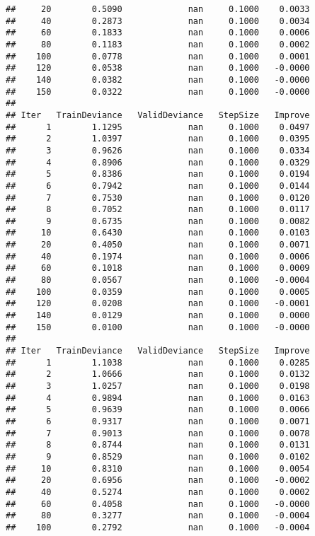 \documentclass[]{article}
\begin{document}
\begin{verbatim}
##     20        0.5090             nan     0.1000    0.0033
##     40        0.2873             nan     0.1000    0.0034
##     60        0.1833             nan     0.1000    0.0006
##     80        0.1183             nan     0.1000    0.0002
##    100        0.0778             nan     0.1000    0.0001
##    120        0.0538             nan     0.1000   -0.0000
##    140        0.0382             nan     0.1000   -0.0000
##    150        0.0322             nan     0.1000   -0.0000
## 
## Iter   TrainDeviance   ValidDeviance   StepSize   Improve
##      1        1.1295             nan     0.1000    0.0497
##      2        1.0397             nan     0.1000    0.0395
##      3        0.9626             nan     0.1000    0.0334
##      4        0.8906             nan     0.1000    0.0329
##      5        0.8386             nan     0.1000    0.0194
##      6        0.7942             nan     0.1000    0.0144
##      7        0.7530             nan     0.1000    0.0120
##      8        0.7052             nan     0.1000    0.0117
##      9        0.6735             nan     0.1000    0.0082
##     10        0.6430             nan     0.1000    0.0103
##     20        0.4050             nan     0.1000    0.0071
##     40        0.1974             nan     0.1000    0.0006
##     60        0.1018             nan     0.1000    0.0009
##     80        0.0567             nan     0.1000   -0.0004
##    100        0.0359             nan     0.1000    0.0005
##    120        0.0208             nan     0.1000   -0.0001
##    140        0.0129             nan     0.1000    0.0000
##    150        0.0100             nan     0.1000   -0.0000
## 
## Iter   TrainDeviance   ValidDeviance   StepSize   Improve
##      1        1.1038             nan     0.1000    0.0285
##      2        1.0666             nan     0.1000    0.0132
##      3        1.0257             nan     0.1000    0.0198
##      4        0.9894             nan     0.1000    0.0163
##      5        0.9639             nan     0.1000    0.0066
##      6        0.9317             nan     0.1000    0.0071
##      7        0.9013             nan     0.1000    0.0078
##      8        0.8744             nan     0.1000    0.0131
##      9        0.8529             nan     0.1000    0.0102
##     10        0.8310             nan     0.1000    0.0054
##     20        0.6956             nan     0.1000   -0.0002
##     40        0.5274             nan     0.1000    0.0002
##     60        0.4058             nan     0.1000   -0.0000
##     80        0.3277             nan     0.1000   -0.0004
##    100        0.2792             nan     0.1000   -0.0004

\end{verbatim}
\end{document}
